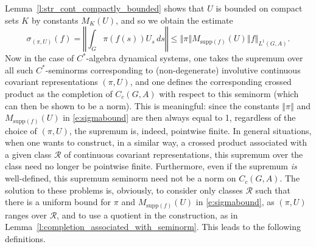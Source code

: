 \documentclass{amsart}
\theoremstyle{plain}
\theoremstyle{definition}
\numberwithin{equation}{section}
\begin{document}
Lemma~\ref{l:str_cont_compactly_bounded} shows that $U$ is bounded on compact sets $K$ by constants $M_K(U)$, and so we obtain the estimate
\begin{equation}\label{e:sigmabound}
  \sigma_{(\pi,U)}(f) = {\left\Vert {\int_G \pi(f(s))U_s \,ds} \right\Vert} \leq {\left\Vert {\pi} \right\Vert} M_{{\text{supp}}(f)}(U) {\left\Vert {f} \right\Vert}_{L^1(G,A)}.
\end{equation}
 Now in the case of $C^*$-algebra dynamical systems, one takes the supremum over all such $C^*$-seminorms corresponding to (non-degenerate) involutive continuous covariant representations ${(\pi,U)}$, and one defines the corresponding crossed product as the completion of $C_c(G,A)$ with respect to this seminorm (which can then be shown to be a norm). This is meaningful: since the constants ${\left\Vert {\pi} \right\Vert}$ and $M_{{\text{supp}}(f)}(U)$ in \eqref{e:sigmabound} are then always equal to 1, regardless of the choice of ${(\pi,U)}$, the supremum is, indeed, pointwise finite. In general situations, when one wants to construct, in a similar way, a crossed product associated with a given class ${\mathcal R}$ of continuous covariant representations, this supremum over the class need no longer be pointwise finite. Furthermore, even if the supremum \emph{is} well-defined, this supremum seminorm need not be a norm on $C_c(G,A)$. The solution to these problems is, obviously, to consider only classes ${\mathcal R}$ such that there is a uniform bound for $\pi$ and $M_{{\text{supp}}(f)}(U)$ in \eqref{e:sigmabound}, as ${(\pi,U)}$ ranges over $\mathcal R$, and to use a quotient in the construction, as in Lemma~\ref{l:completion_associated_with_seminorm}. This leads to the following definitions.
\end{document}
